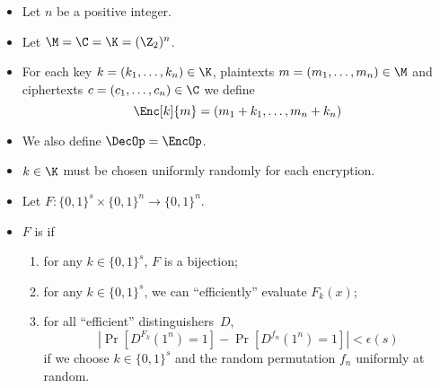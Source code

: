 \begin{frame}
  \begin{example}
    \begin{itemize}
      \item Let \(n\) be a positive integer.
      \item Let \(\M = \C = \K = (\Z_2)^n\).

        \pause{}

      \item For each key \(k = (k_1, \ldots, k_n)\in \K\), plaintexts \(m 
          = (m_1, \ldots, m_n)\in \M\) and ciphertexts \(c = (c_1, \ldots, 
          c_n)\in \C\) we define
        \[\Enc[k]{m} = (m_1 + k_1, \ldots, m_n + k_n)\]

        \pause{}

      \item We also define \(\DecOp = \EncOp\).

        \pause{}

      \item \(k\in \K\) must be chosen uniformly randomly for each encryption.
    \end{itemize}
  \end{example}
\end{frame}

\begin{frame}
  \begin{definition}
    \begin{itemize}
      \item Let \(F\colon \{0,1\}^s\times \{0, 1\}^n\to \{0,1\}^n\).

        \pause{}

      \item \(F\) is  if
        \begin{enumerate}
          \item for any \(k\in \{0, 1\}^s\), \(F\) is a bijection;

            \pause{}

          \item for any \(k\in \{0, 1\}^s\), we can \enquote{efficiently} 
            evaluate \(F_k(x)\);

            \pause{}

          \item for all \enquote{efficient} distinguishers~\(D\),
            \[\left|\Pr[D^{F_k}(1^n) = 1] - \Pr[D^{f_n}(1^n) = 1]\right| 
              < \epsilon(s)\] if we choose \(k\in \{0,1\}^s\) and the random 
            permutation \(f_n\) uniformly at random.
        \end{enumerate}
    \end{itemize}
  \end{definition}
\end{frame}



\begin{frame}[allowframebreaks]
  \printbibliography{}
\end{frame}

